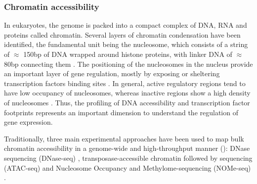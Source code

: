 \subsubsection{Chromatin accessibility} \label{section:chromatin_accessibility}

In eukaryotes, the genome is packed into a compact complex of DNA, RNA and proteins called chromatin. Several layers of chromatin condensation have been identified, the fundamental unit being the nucleosome, which consists of a string of $\approx$  150bp of DNA wrapped around histone proteins, with linker DNA of $\approx$ 80bp connecting them \cite{Klemm2019,Tsompana2014}. The positioning of the nucleosomes in the nucleus provide an important layer of gene regulation, mostly by exposing or sheltering transcription factors binding sites \cite{Jiang2009}. In general, active regulatory regions tend to have low occupancy of nucleosomes, whereas inactive regions show a high density of nucleosomes \cite{Struhl2013}. Thus, the profiling of DNA accessibility and transcription factor footprints represents an important dimension to understand the regulation of gene expression.


Traditionally, three main experimental approaches have been used to map bulk chromatin accessibility in a genome-wide and high-throughput manner \cite{Nordstrom2019} (): DNase sequencing (DNase-seq) \cite{Song2010}, transposase-accessible chromatin followed by sequencing (ATAC-seq) \cite{Buenrostro2013} and Nucleosome Occupancy and Methylome-sequencing (NOMe-seq) \cite{Kelly2012}.


